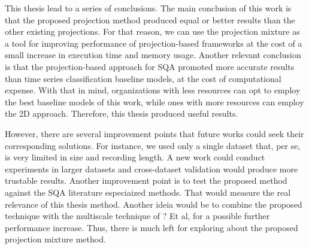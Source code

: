 
This thesis lead to a series of conclusions. The main conclusion of this work is that the proposed projection method produced equal or better results than the other existing projections. For that reason, we can use the projection mixture as a tool for improving performance of projection-based frameworks at the cost of a small increase in execution time and memory usage. Another relevant conclusion is that the projection-based approach for SQA promoted more accurate results than time series classification baseline models, at the cost of computational expense. With that in mind, organizations with less resources can opt to employ the best baseline models of this work, while ones with more resources can employ the 2D approach. Therefore, this thesis produced useful results. 

However, there are several improvement points that future works could seek their corresponding solutions. For instance, we used only a single dataset that, per se, is very limited in size and recording length. A new work could conduct experiments in larger datasets and cross-dataset validation would produce more trustable results. Another improvement point is to test the proposed method against the SQA literature especiaized methods. That would measure the real relevance of this thesis method. Another ideia would be to combine the proposed technique with the multiscale technique of ? Et al, for a possible further performance increase. Thus, there is much left for exploring about the proposed projection mixture method.

